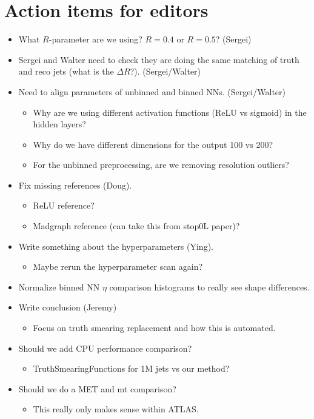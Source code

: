\documentclass[showpacs,showkeys,preprint,prd,nofootinbib,linenumbers,12pt]{revtex4-1}
\begin{document}
\section{Action items for editors}
\begin{itemize}
\item What $R$-parameter are we using? $R=0.4$ or $R=0.5$? (Sergei)
\item Sergei and Walter need to check they are doing the same matching of truth and reco jets (what is the $\Delta R$?). (Sergei/Walter)
\item Need to align parameters of unbinned and binned NNs. (Sergei/Walter)
  \begin{itemize}
  \item Why are we using different activation functions (ReLU vs sigmoid) in the hidden layers?
  \item Why do we have different dimensions for the output 100 vs 200?
  \item For the unbinned preprocessing, are we removing resolution outliers?
  \end{itemize}
\item Fix missing references (Doug).
  \begin{itemize}
  \item ReLU reference?
  \item Madgraph reference (can take this from stop0L paper)?
  \end{itemize}
\item Write something about the hyperparameters (Ying).
  \begin{itemize}
  \item Maybe rerun the hyperparameter scan again?
  \end{itemize}
\item Normalize binned NN $\eta$ comparison histograms to really see shape differences. 
\item Write conclusion (Jeremy)
  \begin{itemize}
  \item Focus on truth smearing replacement and how this is automated.
  \end{itemize}
\item Should we add CPU performance comparison?
  \begin{itemize}
  \item TruthSmearingFunctions for 1M jets vs our method?
  \end{itemize}
\item Should we do a MET and mt comparison?
  \begin{itemize}
  \item This really only makes sense within ATLAS.
  \end{itemize}
\end{itemize}
\end{document}
